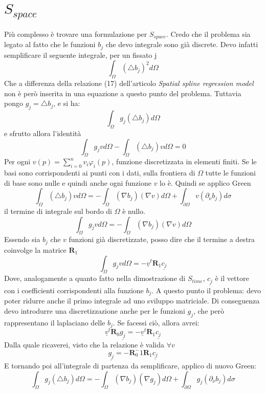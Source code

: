 \documentclass[a4paper,12pt]{report}				%
\begin{document}
\section{$S_{space}$}
Più complesso è trovare una formulazione per $S_{space}$. Credo che il problema sia legato al fatto che le funzioni $b_j$ che devo integrale sono già discrete.
\newline
Devo infatti semplificare il seguente integrale, per un fissato j
$$
\int_\Omega (\bigtriangleup b_j)^2d\Omega
$$
Che a differenza della relazione (17) dell'articolo \textit{Spatial spline regression model} non è però inserita in una equazione a questo punto del problema.
\newline
Tuttavia pongo $g_j=\bigtriangleup b_j$, e si ha:
$$
\int_\Omega g_j(\bigtriangleup b_j)d\Omega
$$
e sfrutto allora l'identità
$$
\int_\Omega g_jvd\Omega - \int_\Omega (\bigtriangleup b_j)vd\Omega=0
$$
Per ogni $v(p)=\sum_{i=0}^nv_i\varphi_i(p)$, funzione discretizzata in elementi finiti. Se le basi sono corrispondenti ai punti con i dati, sulla frontiera di $\Omega$ tutte le funzioni di base sono nulle e quindi anche ogni funzione $v$ lo è. Quindi se applico Green
$$
\int_\Omega (\bigtriangleup b_j)vd\Omega=-\int_\Omega (\nabla b_j)(\nabla v)d\Omega + \int_{\partial \Omega}v(\partial_{\nu}b_j)d\sigma
$$
il termine di integrale sul bordo di $\Omega$ è nullo.
\newline
$$
\int_{\Omega} g_jvd\Omega = -\int_{\Omega} (\nabla b_j)(\nabla v)d\Omega
$$
Essendo sia $b_j$ che $v$ funzioni già discretizzate, posso dire che il termine a destra coinvolge la matrice $\mathbf{R}_1$
$$
\int_{\Omega} g_jvd\Omega = -\underline{v}^t\mathbf{R}_1 \underline{c_j}
$$
Dove, analogamente a quanto fatto nella dimostrazione di $S_{time}$, $\underline{c_j}$ è il vettore con i coefficienti corrispondenti alla funzione $b_j$. 
\newline
A questo punto il problema: devo poter ridurre anche il primo integrale ad uno sviluppo matriciale. Di conseguenza devo introdurre una discretizzazione anche per le funzioni $g_j$, che però rappresentano il laplaciano delle $b_j$. Se facessi ciò, allora avrei:
$$
\underline{v}^t\mathbf{R}_0 \underline{g_j} = -\underline{v}^t\mathbf{R}_1 \underline{c_j}
$$
Dalla quale ricaverei, visto che la relazione è valida $\forall v$
$$
\underline{g_j}=-\mathbf{R}_0^-1\mathbf{R}_1\underline{c_j}
$$
E tornando poi all'integrale di partenza da semplificare, applico di nuovo Green:
$$
\int_\Omega g_j(\bigtriangleup b_j)d\Omega=-\int_{\Omega} (\nabla b_j)(\nabla g_j)d\Omega + \int_{\partial \Omega}g_j(\partial_{\nu}b_j)d\sigma
$$
\end{document}
